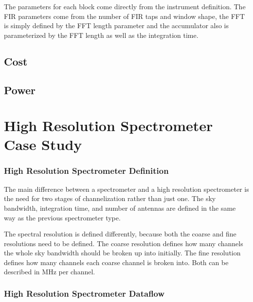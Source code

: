 The parameters for each block come directly from the instrument definition. 
The FIR parameters come from the number of FIR taps and window shape, the FFT is simply defined by the FFT length parameter and the accumulator also is parameterized by the FFT length as well as the integration time. 

\subsection{Cost}
\subsection{Power}

\section{High Resolution Spectrometer Case Study}
\subsubsection{High Resolution Spectrometer Definition}
The main difference between a spectrometer and a high resolution spectrometer is the need for two stages of channelization rather than just one. 
The sky bandwidth, integration time, and number of antennas are defined in the same way as the previous spectrometer type. 

The spectral resolution is defined differently, because both the coarse and fine resolutions need to be defined. 
The coarse resolution defines how many channels the whole sky bandwidth should be broken up into initially.
The fine resolution defines how many channels each coarse channel is broken into.
Both can be described in MHz per channel.

\subsubsection{High Resolution Spectrometer Dataflow}

